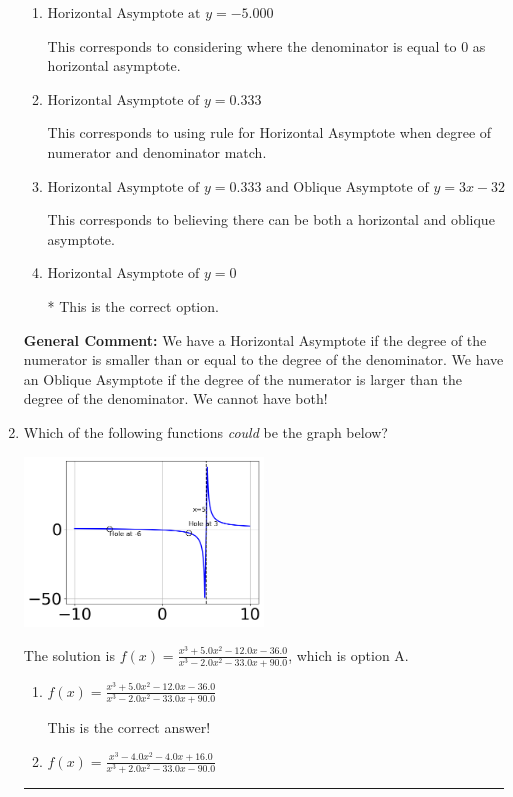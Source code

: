 \documentclass{extbook}[14pt]
\newcommand{\litem}[1]{\item #1

\rule{\textwidth}{0.4pt}}
\begin{document}
\begin{enumerate}
{\begin{enumerate}[label=\Alph*.]
This corresponds to flipping the numerator and denominator, then using synthetic division to find the oblique asymptote.
\item \( \text{Horizontal Asymptote at } y = -5.000 \)

This corresponds to considering where the denominator is equal to 0 as horizontal asymptote.
\item \( \text{Horizontal Asymptote of } y = 0.333  \)

This corresponds to using rule for Horizontal Asymptote when degree of numerator and denominator match.
\item \( \text{Horizontal Asymptote of } y = 0.333 \text{ and Oblique Asymptote of } y = 3x -32 \)

This corresponds to believing there can be both a horizontal and oblique asymptote.
\item \( \text{Horizontal Asymptote of } y = 0 \)

* This is the correct option.
\end{enumerate}

\textbf{General Comment:} We have a Horizontal Asymptote if the degree of the numerator is smaller than or equal to the degree of the denominator. We have an Oblique Asymptote if the degree of the numerator is larger than the degree of the denominator. We cannot have both!
}
\litem{
Which of the following functions \textit{could} be the graph below?

\begin{center}
    \includegraphics[width=0.5\textwidth]{../Figures/identifyGraphOfRationalFunctionCopyC.png}
\end{center}


The solution is \( f(x)=\frac{x^{3} +5.0 x^{2} -12.0 x -36.0}{x^{3} -2.0 x^{2} -33.0 x + 90.0} \), which is option A.\begin{enumerate}[label=\Alph*.]
\item \( f(x)=\frac{x^{3} +5.0 x^{2} -12.0 x -36.0}{x^{3} -2.0 x^{2} -33.0 x + 90.0} \)

This is the correct answer!
\item \( f(x)=\frac{x^{3} -4.0 x^{2} -4.0 x + 16.0}{x^{3} +2.0 x^{2} -33.0 x -90.0} \)


\end{enumerate}}
\end{enumerate}
\end{document}
